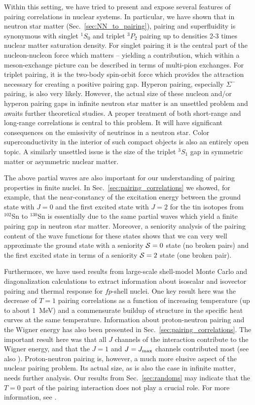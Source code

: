 \documentclass[preprint,rmp,aps,floatfix]{revtex4}
\begin{document}
Within this setting, we have 
tried to present and expose several features of pairing 
correlations in nuclear systems. 
In particular, we have shown that in neutron star matter 
(Sec.~\ref{sec:NN_to_pairing}), pairing and superfluidity is synonymous with
singlet $^1S_0$ and triplet $^3P_2$ pairing up to densities 2-3 times nuclear
matter saturation density. 
For singlet pairing it is the central part of the nucleon-nucleon 
force which matters -- yielding a contribution, 
which within a meson-exchange picture  
can be described in terms of multi-pion exchanges. 
For triplet pairing, it is the two-body spin-orbit force which provides
the attraction necessary for creating a positive pairing gap.
Hyperon pairing, especially $\Sigma^-$ pairing, is also
very likely. However, the actual size of these 
nucleon and/or hyperon pairing gaps
in infinite neutron star matter is an unsettled 
problem and awaits further theoretical studies.
A proper treatment of both short-range and long-range correlations 
is central to this problem.
It will have significant consequences on the emissivity of 
neutrinos in a neutron star. Color superconductivity in the interior of such 
compact objects is also an entirely open topic. A similarly unsettled issue 
is the size of 
the triplet $^3S_1$ gap in symmetric matter or asymmetric nuclear matter. 


The above partial waves are also important for our understanding of pairing 
properties in finite nuclei. In Sec.~\ref{sec:pairing_correlations} 
we showed, for example, that the near-constancy 
of the excitation energy between the ground state 
with $J=0$ and the first excited state with $J=2$ 
for the tin isotopes from $^{102}$Sn to $^{130}$Sn is essentially due to the 
same partial waves which yield a finite pairing gap in neutron star matter.
Moreover, a seniority analysis of the pairing content of the wave functions 
for these states shows that we can very well approximate the ground state 
with a seniority ${\cal S} = 0$ state (no broken pairs) and the first 
excited state in terms of a 
seniority   ${\cal S} = 2$ state (one broken pair).

Furthermore, we have used results from large-scale shell-model Monte Carlo 
and diagonalization
calculations to extract information about isoscalar and isovector pairing
and thermal response 
for $fp$-shell nuclei. 
One key result here was the decrease of $T=1$ pairing correlations 
as a function of increasing temperature (up to about 1~MeV) 
and a commensurate buildup of structure in the specific heat 
curves at the same temperature. 
Information about proton-neutron pairing and the Wigner 
energy has also been presented in Sec.~\ref{sec:pairing_correlations}.
The important result here was that all $J$ channels of the 
interaction contribute to the
Wigner energy, and that the $J=1$ and $J=J_{\rm max}$ channels contributed
most (see also \cite{poves98}).
Proton-neutron pairing is, however, a much more elusive  aspect 
of the nuclear pairing problem. 
Its actual size, as is also the case in infinite 
matter, needs further analysis. 
Our results from Sec.~\ref{sec:randoms} may
indicate that the $T=0$ part of the pairing
interaction does not play a crucial role. For more information, see
\cite{volodya1996,volya_2}. 
\end{document}
